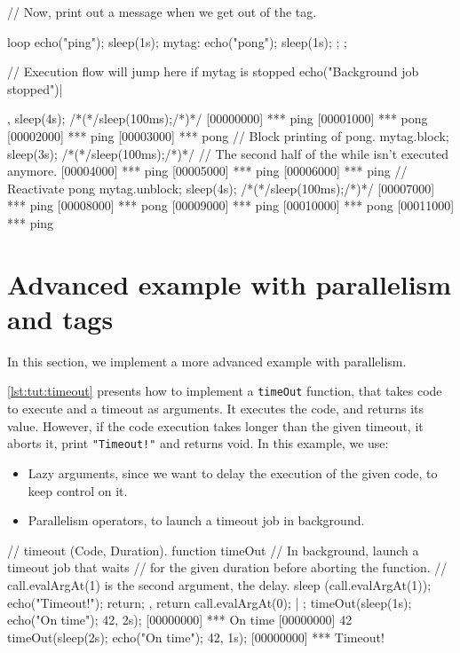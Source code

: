 \begin{urbiscript}[caption=Blocking chunks of code, label=lst:tut:block]
// Now, print out a message when we get out of the tag.
{
  loop
  {
    echo("ping"); sleep(1s);
    mytag: { echo("pong"); sleep(1s); };
  };

  // Execution flow will jump here if mytag is stopped
  echo("Background job stopped")|
},
sleep(4s);
/*(*/sleep(100ms);/*)*/
[00000000] *** ping
[00001000] *** pong
[00002000] *** ping
[00003000] *** pong
// Block printing of pong.
mytag.block;
sleep(3s);
/*(*/sleep(100ms);/*)*/
// The second half of the while isn't executed anymore.
[00004000] *** ping
[00005000] *** ping
[00006000] *** ping
// Reactivate pong
mytag.unblock;
sleep(4s);
/*(*/sleep(100ms);/*)*/
[00007000] *** ping
[00008000] *** pong
[00009000] *** ping
[00010000] *** pong
[00011000] *** ping
\end{urbiscript}

\section{Advanced example with parallelism and tags}

In this section, we implement a more advanced example with
parallelism.

\autoref{lst:tut:timeout} presents how to implement a \lstinline{timeOut}
function, that takes code to execute and a timeout as arguments. It
executes the code, and returns its value. However, if the code
execution takes longer than the given timeout, it aborts it, print
\lstinline|"Timeout!"| and returns void. In this example, we use:

\begin{itemize}
\item Lazy arguments, since we want to delay the execution of the
  given code, to keep control on it.
\item Parallelism operators, to launch a timeout job in background.
\end{itemize}

\begin{urbiscript}[caption=Implementing a timeout method, label=lst:tut:timeout]
// timeout (Code, Duration).
function timeOut
{
  // In background, launch a timeout job that waits
  // for the given duration before aborting the function.
  // call.evalArgAt(1) is the second argument, the delay.
  {
    sleep (call.evalArgAt(1));
    echo("Timeout!");
    return;
  },
  return call.evalArgAt(0);
} | {};
timeOut({sleep(1s); echo("On time"); 42}, 2s);
[00000000] *** On time
[00000000] 42
timeOut({sleep(2s); echo("On time"); 42}, 1s);
[00000000] *** Timeout!
\end{urbiscript}


